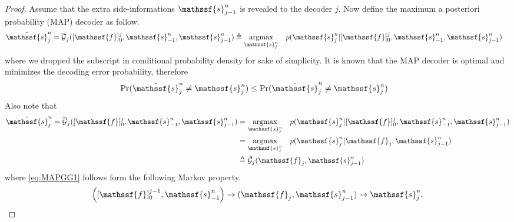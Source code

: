 \documentclass[journal, twocolumn, 10pt]{IEEEtran}
\newcommand{\defeq}{\stackrel{\Delta}{=}}
\newcommand{\cG}{{\mathcal{G}}}
\renewcommand{\defeq}{\triangleq}
\newcommand{\rvf}{{\mathssf{f}}}    %
\newcommand{\rvs}{{\mathssf{s}}}    %
\begin{document}
{\begin{proof}
Assume that the extra side-informations $\rvs^n_{j-1}$ %
is revealed to the decoder $j$.
Now define the maximum a posteriori probability (MAP) decoder as follow. 
\begin{align}
&\tilde{\rvs}_j^n = {\overline{\cG}}_{j}([\rvf]_0^j,\rvs_{-1}^n, \rvs^n_{j-1}) \triangleq \underset{\rvs_j^n}{\operatorname{argmax}} \quad   p(\rvs_j^n | [\rvf]_0^{j},\rvs_{-1}^n, \rvs^n_{j-1}) \label{eq:MAP1}
\end{align} where we dropped the subscript in conditional probability density for sake of simplicity.
It is known that the MAP decoder is optimal and minimizes the decoding error probability, therefore
\begin{align}
&\Pr(\tilde{\rvs}_j^n \neq \rvs_j^n) \le \Pr(\hat{\rvs}_j^n \neq \rvs_j^n)  \label{eq:ineq1}
\end{align}
Also note that 
\begin{align}
\tilde{\rvs}_j^n = {\overline{\cG}}_{j}([\rvf]_0^j,\rvs_{-1}^n, \rvs_{j-1}^n)& = \underset{\rvs_j^n}{\operatorname{argmax}} \quad   p(\rvs_j^n | [\rvf]_0^{j},\rvs_{-1}^n,\rvs_{j-1}^n) \label{eq:MAPG1O}\\
& =\underset{\rvs_j^n}{\operatorname{argmax}} \quad   p(\rvs_j^n | \rvf_{j},\rvs_{j-1}^n) \label{eq:MAPGG1}\\
&\defeq  \tilde{\cG}_{j}(\rvf_{j},\rvs_{j-1}^n) \label{eq:De1}
\end{align} where \eqref{eq:MAPGG1} follows form the following Markov property. 
\begin{align}
\left([\rvf]_0^{j-1}, \rvs_{-1}^n\right) \rightarrow (\rvf_{j}, \rvs_{j-1}^n) \rightarrow \rvs_{j}^n.
\end{align} 

\end{proof}}
\end{document}
